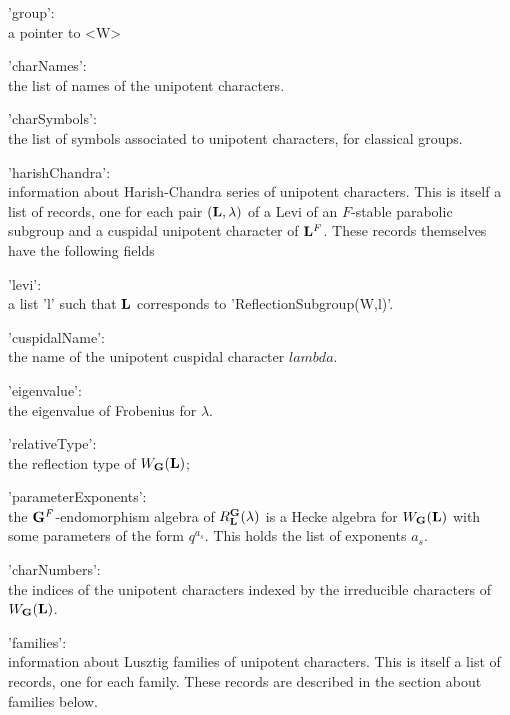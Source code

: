 'group':\\ a pointer to <W>

'charNames':\\  the list of names of the unipotent characters.

'charSymbols':\\ the list of symbols associated to unipotent characters,
for classical groups.

'harishChandra':\\  information  about  Harish-Chandra  series of unipotent
characters.   This  is  itself  a  list  of  records,  one  for  each  pair
$({\bf L},\lambda)$  of  a  Levi  of  an  $F$-stable  parabolic  subgroup and a
cuspidal  unipotent character of ${\bf L}^F$. These records themselves have the
following fields\:

'levi':\\ a list 'l' such that ${\bf L}$ corresponds to 'ReflectionSubgroup(W,l)'.

'cuspidalName':\\ the name of the unipotent cuspidal character $lambda$.

'eigenvalue':\\ the eigenvalue of Frobenius for $\lambda$.

'relativeType':\\ the reflection type of $W_{\bf G}({\bf L})$;

'parameterExponents':\\ the ${\bf G}^F$-endomorphism algebra of
$R_{\bf L}^{\bf G}(\lambda)$   is  a  Hecke  algebra  for  $W_{\bf G}({\bf L})$  with  some
parameters of the form $q^{a_s}$. This holds the list of exponents $a_s$.

'charNumbers':\\ the indices of the unipotent characters indexed
by the irreducible characters of $W_{\bf G}({\bf L})$.

'families':\\  information about Lusztig  families of unipotent characters.
This  is itself a list  of records, one for  each family. These records are
described in the section about families below.


